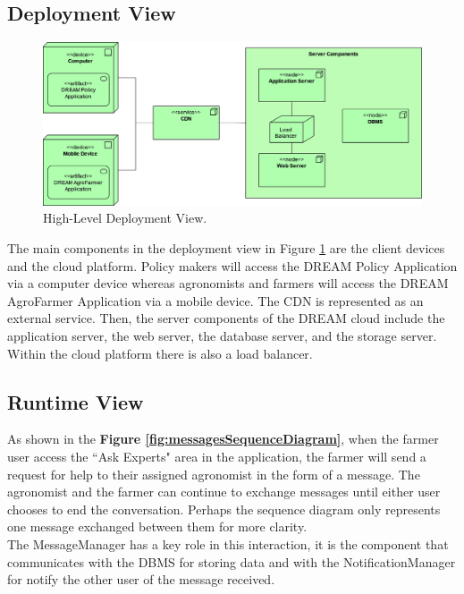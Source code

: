 \subsection{Deployment View}
\begin{figure}[hbt!]
\centering
\includegraphics[width=\textwidth]{../images_diagrams/dd/highlevel_deployment.png}
\caption{High-Level Deployment View.}
\label{fig:highLevelDeploy}
\end{figure}

\noindent
The main components in the deployment view in Figure \ref{fig:highLevelDeploy} are the client devices and the cloud platform. Policy makers will access the DREAM Policy Application via a computer device whereas agronomists and farmers will access the DREAM AgroFarmer Application via a mobile device. The CDN is represented as an external service. Then, the server components of the DREAM cloud include the application server, the web server, the database server, and the storage server. Within the cloud platform there is also a load balancer.



\subsection{Runtime View}


\noindent
As shown in the \textbf{Figure \ref{fig:messagesSequenceDiagram}}, when the farmer user access the “Ask Experts" area in the application, the farmer will send a request for help to their assigned agronomist in the form of a message. The agronomist and the farmer can continue to exchange messages until either user chooses to end the conversation. Perhaps the sequence diagram only represents one message exchanged between them for more clarity.\\
The MessageManager has a key role in this interaction, it is the component that communicates with the DBMS for storing data and with the NotificationManager for notify the other user of the message received.\\


